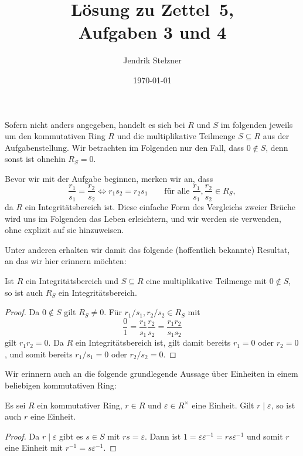 \documentclass[a4paper,10pt,numbers=noenddot]{scrartcl}
\title{Lösung zu Zettel~5, \\ Aufgaben 3 und 4}
\author{Jendrik Stelzner}
\date{\today}
\begin{document}
\maketitle

\addtocounter{section}{2}










\section{}

Sofern nicht anders angegeben, handelt es sich bei $R$ und $S$ im folgenden jeweils um den kommutativen Ring $R$ und die multiplikative Teilmenge $S \subseteq R$ aus der Aufgabenstellung.
Wir betrachten im Folgenden nur den Fall, dass $0 \notin S$, denn sonst ist ohnehin $R_S = 0$.

Bevor wir mit der Aufgabe beginnen, merken wir an, dass
\[
        \frac{r_1}{s_1} = \frac{r_2}{s_2}
  \iff  r_1 s_2 = r_2 s_1
  \qquad
  \text{für alle $\frac{r_1}{s_1}, \frac{r_2}{s_2} \in R_S$},
\]
da $R$ ein Integritätsbereich ist.
Diese einfache Form des Vergleichs zweier Brüche wird uns im Folgenden das Leben erleichtern, und wir werden sie verwenden, ohne explizit auf sie hinzuweisen.

Unter anderen erhalten wir damit das folgende (hoffentlich bekannte) Resultat, an das wir hier erinnern möchten:
\begin{lemma}
  \label{lemma: localization of integral domains are integral domains}
  Ist $R$ ein Integritätsbereich und $S \subseteq R$ eine multiplikative Teilmenge mit $0 \notin S$, so ist auch $R_S$ ein Integritätsbereich.
\end{lemma}
\begin{proof}
  Da $0 \notin S$ gilt $R_S \neq 0$.
  Für $r_1/s_1, r_2/s_2 \in R_S$ mit
  \[
      \frac{0}{1}
    = \frac{r_1}{s_1} \frac{r_2}{s_2}
    = \frac{r_1 r_2}{s_1 s_2}
  \]
  gilt $r_1 r_2 = 0$.
  Da $R$ ein Integritätsbereich ist, gilt damit bereits $r_1 = 0$ oder $r_2 = 0$, und somit bereits $r_1/s_1 = 0$ oder $r_2/s_2 = 0$.
\end{proof}

Wir erinnern auch an die folgende grundlegende Aussage über Einheiten in einem beliebigen kommutativen Ring:

\begin{lemma}
  \label{lemma: divisors of units are units themselves}
  Es sei $R$ ein kommutativer Ring, $r \in R$ und $\varepsilon \in R^\times$ eine Einheit.
  Gilt $r \mid \varepsilon$, so ist auch $r$ eine Einheit.
\end{lemma}
\begin{proof}
  Da $r \mid \varepsilon$ gibt es $s \in S$ mit $rs = \varepsilon$.
  Dann ist $1 = \varepsilon \varepsilon^{-1} = r s \varepsilon^{-1}$ und somit $r$ eine Einheit mit $r^{-1} = s \varepsilon^{-1}$.
\end{proof}
\end{document}
